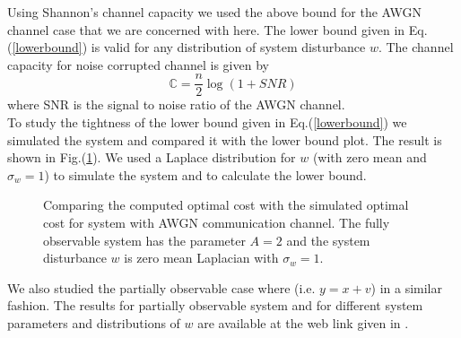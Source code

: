 \documentclass[12pt]{caltech_thesis_finalreport}
\begin{document}
	Using Shannon's channel capacity we used the above bound for the AWGN channel case that we are concerned with here. The lower bound given in Eq.(\ref{lowerbound}) is valid for any distribution of system disturbance $w$. The channel capacity for noise corrupted channel is given by
	\begin{equation}
		\mathbb{C} = \frac{n}{2} \log\left( 1 + SNR \right)
	\end{equation}
	where SNR is the signal to noise ratio of the AWGN channel.
	 \\To study the tightness of the lower bound given in Eq.(\ref{lowerbound}) we simulated the system and compared it with the lower bound plot. The result is shown in Fig.(\ref{lowerbound_vs_laplace}). We used a Laplace distribution for $w$ (with zero mean and $\sigma_{w} = 1$) to simulate the system and to calculate the lower bound. 
		\begin{figure}[H]
			  \centering
			 \tiny{	
			}
			  \caption{Comparing the computed optimal cost with the simulated optimal cost for system with AWGN communication channel. The fully observable system has the parameter $A = 2$ and the system disturbance $w$ is zero mean Laplacian with $\sigma_{w} = 1$.}
			 \label{lowerbound_vs_laplace}
		\end{figure}	
		We also studied the partially observable case where (i.e. $y = x + v$) in a similar fashion. The results for partially observable system and for different system parameters and distributions of $w$ are available at the web link given in \cite{git}.
\end{document}
